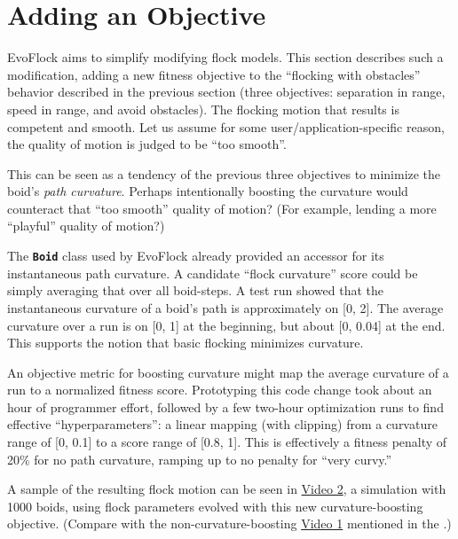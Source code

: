\documentclass[letterpaper]{article}
\newcommand{\code}[1]{\textbf{\small \texttt{#1}}}
\begin{document}

\section{Adding an Objective}
\label{sec:add_objective}

EvoFlock aims to simplify modifying flock models. This section describes such a modification, adding a new fitness objective to the ``flocking with obstacles'' behavior described in the previous section (three objectives: separation in range, speed in range, and avoid obstacles). The flocking motion that results is competent and smooth. Let us assume for some user/application-specific reason, the quality of motion is judged to be ``too smooth''. 

This can be seen as a tendency of the previous three objectives to minimize the boid's \textit{path curvature}. Perhaps intentionally boosting the curvature would counteract that ``too smooth'' quality of motion? (For example, lending a more ``playful'' quality of motion?)

The \code{Boid} class used by EvoFlock already provided an accessor for its instantaneous path curvature. A candidate ``flock curvature'' score could be simply averaging that over all boid-steps. A test run showed that the instantaneous curvature of a boid's path is approximately on [0, 2]. The average curvature over a run is on [0, 1] at the beginning, but about [0, 0.04] at the end. This supports the notion that basic flocking minimizes curvature.

An objective metric for boosting curvature might map the average curvature of a run to a normalized fitness score. Prototyping this code change took about an hour of programmer effort, followed by a few two-hour optimization runs to find effective ``hyperparameters'': a linear mapping (with clipping) from a curvature range of [0, 0.1] to a score range of [0.8, 1]. This is effectively a fitness penalty of 20\% for no path curvature, ramping up to no penalty for ``very curvy.'' 

A sample of the resulting flock motion can be seen in \href{https://drive.google.com/file/d/1HOeCqkmY__SiON4TCAQyPKa3CviIlPgM/view?usp=sharing}{Video 2}, a simulation with 1000 boids, using flock parameters evolved with this new curvature-boosting objective. (Compare with the non-curvature-boosting \href{https://drive.google.com/file/d/1ZbanvWVfapnH2TpTqamypWFoXuMeoY9b/view?usp=sharing}{Video 1} mentioned in the .)
\end{document}
